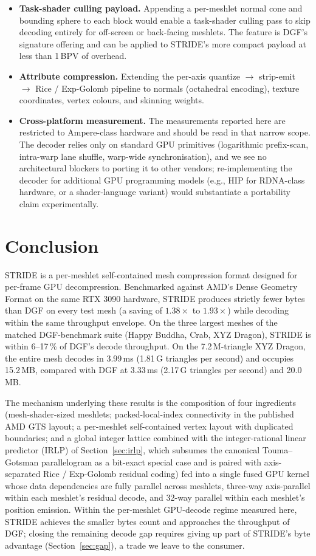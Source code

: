 \documentclass[pdflatex,sn-vancouver-num]{sn-jnl}%
\theoremstyle{thmstyleone}%
\theoremstyle{thmstyletwo}%
\theoremstyle{thmstylethree}%
\begin{document}
\begin{itemize}
\item \textbf{Task-shader culling payload.} Appending a per-meshlet normal cone and bounding sphere to each block would enable a task-shader culling pass to skip decoding entirely for off-screen or back-facing meshlets. The feature is DGF's signature offering and can be applied to STRIDE's more compact payload at less than 1\,BPV of overhead.
\item \textbf{Attribute compression.} Extending the per-axis quantize $\rightarrow$ strip-emit $\rightarrow$ Rice / Exp-Golomb pipeline to normals (octahedral encoding), texture coordinates, vertex colours, and skinning weights.
\item \textbf{Cross-platform measurement.} The measurements reported here are restricted to Ampere-class hardware and should be read in that narrow scope. The decoder relies only on standard GPU primitives (logarithmic prefix-scan, intra-warp lane shuffle, warp-wide synchronisation), and we see no architectural blockers to porting it to other vendors; re-implementing the decoder for additional GPU programming models (e.g., HIP for RDNA-class hardware, or a shader-language variant) would substantiate a portability claim experimentally.
\end{itemize}

\section{Conclusion}\label{sec:conclusion}

STRIDE is a per-meshlet self-contained mesh compression format designed for per-frame GPU decompression. Benchmarked against AMD's Dense Geometry Format on the same RTX 3090 hardware, STRIDE produces strictly fewer bytes than DGF on every test mesh (a saving of $1.38\times$ to $1.93\times$) while decoding within the same throughput envelope. On the three largest meshes of the matched DGF-benchmark suite (Happy Buddha, Crab, XYZ Dragon), STRIDE is within 6--17\,\% of DGF's decode throughput. On the 7.2\,M-triangle XYZ Dragon, the entire mesh decodes in 3.99\,ms (1.81\,G triangles per second) and occupies 15.2\,MB, compared with DGF at 3.33\,ms (2.17\,G triangles per second) and 20.0\,MB.

The mechanism underlying these results is the composition of four ingredients (mesh-shader-sized meshlets; packed-local-index connectivity in the published AMD GTS layout; a per-meshlet self-contained vertex layout with duplicated boundaries; and a global integer lattice combined with the integer-rational linear predictor (IRLP) of Section~\ref{sec:irlp}, which subsumes the canonical Touma--Gotsman parallelogram as a bit-exact special case and is paired with axis-separated Rice / Exp-Golomb residual coding) fed into a single fused GPU kernel whose data dependencies are fully parallel across meshlets, three-way axis-parallel within each meshlet's residual decode, and 32-way parallel within each meshlet's position emission. Within the per-meshlet GPU-decode regime measured here, STRIDE achieves the smaller bytes count and approaches the throughput of DGF; closing the remaining decode gap requires giving up part of STRIDE's byte advantage (Section~\ref{sec:gap}), a trade we leave to the consumer.
\end{document}
